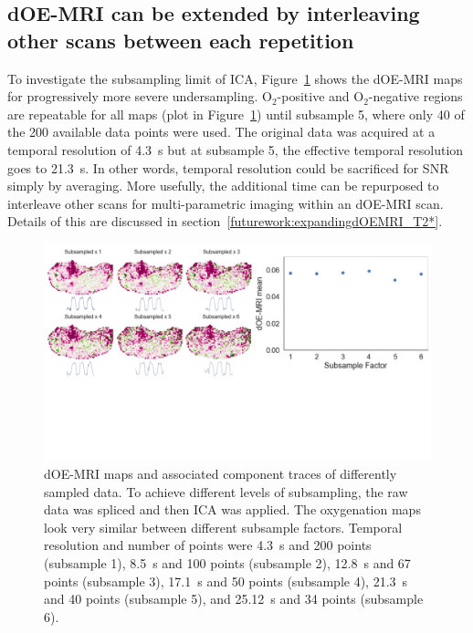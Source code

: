 \subsection{dOE-MRI can be extended by interleaving other scans between each repetition}
\label{sec:interleave}
To investigate the subsampling limit of \acs{ICA}, Figure~\ref{subSample} shows the \acs{dOE-MRI} maps for progressively more severe undersampling.
O$_2$-positive and O$_2$-negative regions are repeatable for all maps (plot in Figure~\ref{subSample}) until subsample 5, where only 40 of the 200 available data points were used.
The original data was acquired at a temporal resolution of 4.3~s but at subsample 5, the effective temporal resolution goes to 21.3~s. 
In other words, temporal resolution could be sacrificed for \acs{SNR} simply by averaging.
More usefully, the additional time can be repurposed to interleave other scans for multi-parametric imaging within an \acs{dOE-MRI} scan.
Details of this are discussed in section~\ref{futurework:expandingdOEMRI_T2*}. 
\begin{figure}[tbhp]
   \centering
   \includegraphics[width=\textwidth]{oemri_thesis1/oemri_thesis1-images/technical_subsample.pdf} %
   \caption{dOE-MRI maps and associated component traces of differently sampled data. To achieve different levels of subsampling, the raw data was spliced and then \acs{ICA} was applied. The oxygenation maps look very similar between different subsample factors. Temporal resolution and number of points were 4.3~s and 200 points (subsample 1), 8.5~s and 100 points (subsample 2), 12.8~s and 67 points (subsample 3), 17.1~s and 50 points (subsample 4), 21.3~s and 40 points (subsample 5), and 25.12~s and 34 points (subsample 6).}
   \label{subSample}
\end{figure}


